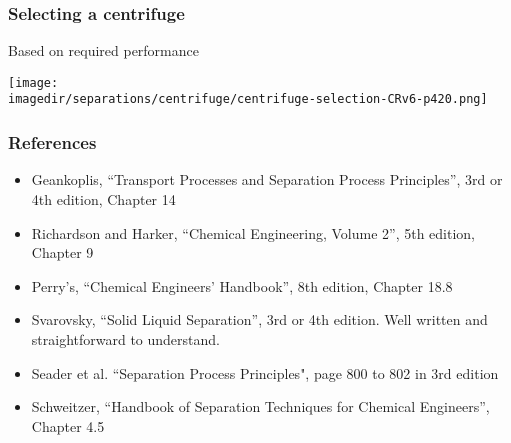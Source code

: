 \begin{frame}\frametitle{Selecting a centrifuge}
	Based on required performance
	\begin{center}
		\texttt{[image: \\imagedir/separations/centrifuge/centrifuge-selection-CRv6-p420.png]}
	\end{center}
\end{frame}

\begin{frame}\frametitle{References}
	\begin{itemize}
		\item	Geankoplis, ``Transport Processes and Separation Process Principles'', 3rd or 4th edition, Chapter 14
		\item	Richardson and Harker, ``Chemical Engineering, Volume 2'', 5th edition, Chapter 9
		\item	Perry's, ``Chemical Engineers' Handbook'', 8th edition, Chapter 18.8 
		\item	Svarovsky, ``Solid Liquid Separation'', 3rd or 4th edition. Well written and straightforward to understand.
		\item	Seader et al. ``Separation Process Principles", page 800 to 802 in 3rd edition 
		\item	Schweitzer, ``Handbook of Separation Techniques for Chemical Engineers'', Chapter 4.5
	\end{itemize}
\end{frame}
